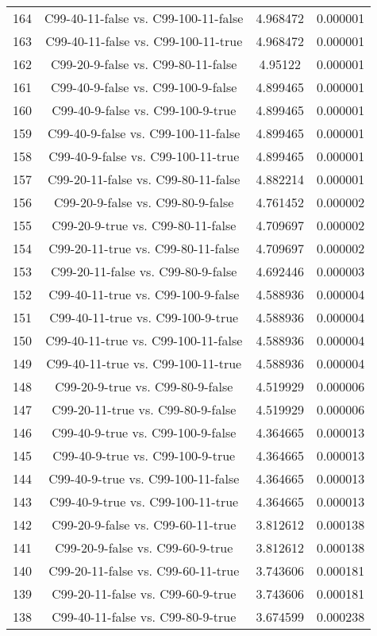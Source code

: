 \documentclass[a4paper,10pt]{article}
\begin{document}
\begin{landscape}
\begin{table}[!htp]
\begin{tabular}{cccc}
164&C99-40-11-false vs. C99-100-11-false&4.968472&0.000001\\
163&C99-40-11-false vs. C99-100-11-true&4.968472&0.000001\\
162&C99-20-9-false vs. C99-80-11-false&4.95122&0.000001\\
161&C99-40-9-false vs. C99-100-9-false&4.899465&0.000001\\
160&C99-40-9-false vs. C99-100-9-true&4.899465&0.000001\\
159&C99-40-9-false vs. C99-100-11-false&4.899465&0.000001\\
158&C99-40-9-false vs. C99-100-11-true&4.899465&0.000001\\
157&C99-20-11-false vs. C99-80-11-false&4.882214&0.000001\\
156&C99-20-9-false vs. C99-80-9-false&4.761452&0.000002\\
155&C99-20-9-true vs. C99-80-11-false&4.709697&0.000002\\
154&C99-20-11-true vs. C99-80-11-false&4.709697&0.000002\\
153&C99-20-11-false vs. C99-80-9-false&4.692446&0.000003\\
152&C99-40-11-true vs. C99-100-9-false&4.588936&0.000004\\
151&C99-40-11-true vs. C99-100-9-true&4.588936&0.000004\\
150&C99-40-11-true vs. C99-100-11-false&4.588936&0.000004\\
149&C99-40-11-true vs. C99-100-11-true&4.588936&0.000004\\
148&C99-20-9-true vs. C99-80-9-false&4.519929&0.000006\\
147&C99-20-11-true vs. C99-80-9-false&4.519929&0.000006\\
146&C99-40-9-true vs. C99-100-9-false&4.364665&0.000013\\
145&C99-40-9-true vs. C99-100-9-true&4.364665&0.000013\\
144&C99-40-9-true vs. C99-100-11-false&4.364665&0.000013\\
143&C99-40-9-true vs. C99-100-11-true&4.364665&0.000013\\
142&C99-20-9-false vs. C99-60-11-true&3.812612&0.000138\\
141&C99-20-9-false vs. C99-60-9-true&3.812612&0.000138\\
140&C99-20-11-false vs. C99-60-11-true&3.743606&0.000181\\
139&C99-20-11-false vs. C99-60-9-true&3.743606&0.000181\\
138&C99-40-11-false vs. C99-80-9-true&3.674599&0.000238\\

\end{tabular}
\end{table}
\end{landscape}
\end{document}
